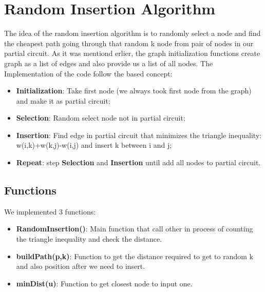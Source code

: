 \section{Random Insertion Algorithm}\label{randominsertion}
The idea of the random insertion algorithm is to randomly select a node and find the cheapest path going through that random k node from pair of nodes in our partial circuit. 
As it was mentiond erlier, the graph initialization functions create graph as a list of edges and also provide us a list of all nodes.
The Implementation of the code follow the based concept:

\begin{itemize}
    \item \textbf{Initialization}: Take first node (we always took first node from the graph) and make it as partial circuit;
    \item \textbf{Selection}: Random select node not in partial circuit;
    \item \textbf{Insertion}: Find edge in partial circuit that minimizes the triangle inequality: w(i,k)+w(k,j)-w(i,j) and insert k between i and j;
    \item \textbf{Repeat}: step \textbf{Selection} and \textbf{Insertion} until add all nodes to partial circuit.
\end{itemize}


\subsection{Functions}
We implemented 3 functions: 

\begin{itemize}
	\item \textbf{RandomInsertion()}: Main function that call other in process of counting the triangle inequality and check the distance.
	\item \textbf{buildPath(p,k)}: Function to get the distance required to get to random k and also position after we need to insert. 
	\item \textbf{minDist(u)}: Function to get closest node to input one.
\end{itemize}

